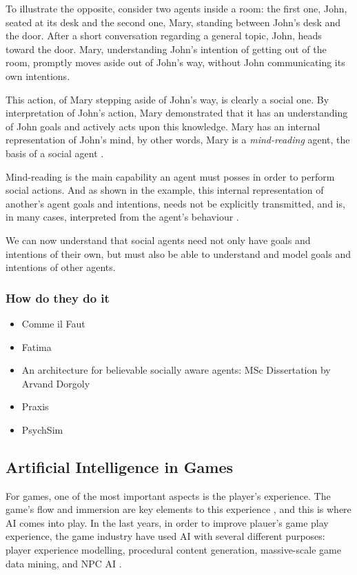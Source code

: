 To illustrate the opposite, consider two agents inside a room: the first one, John, seated at its desk and the second one, Mary, standing between John's desk and the door.
After a short conversation regarding a general topic, John, heads toward the door.
Mary, understanding John's intention of getting out of the room, promptly moves aside out of John's way, without John communicating its own intentions.

This action, of Mary stepping aside of John's way, is clearly a social one.
By interpretation of John's action, Mary demonstrated that it has an understanding of John goals and actively acts upon this knowledge.
Mary has an internal representation of John's mind, by other words, Mary is a \textit{mind-reading} agent, the basis of a social agent \cite{castelfranchi:socialactions}.

Mind-reading is the main capability an agent must posses in order to perform social actions.
And as shown in the example, this internal representation of another's agent goals and intentions, needs not be explicitly transmitted, and is, in many cases, interpreted from the agent's behaviour \cite{castelfranchi:socialactions}.

We can now understand that social agents need not only have goals and intentions of their own, but must also be able to understand and model goals and intentions of other agents.

\subsubsection{How do they do it}
\begin{itemize}
\item Comme il Faut
\item Fatima
\item An architecture for believable socially aware agents: MSc Dissertation by Arvand Dorgoly
\item Praxis
\item PsychSim
\end{itemize}
\subsection{Artificial Intelligence in Games}

For games, one of the most important aspects is the player's experience.
The game's flow and immersion are key elements to this experience \cite{ijsselsteijn:userexperience}, and this is where \ac{AI} comes into play.
In the last years, in order to improve plauer's game play experience, the game industry have used \ac{AI} with several different purposes: player experience modelling, procedural content generation, massive-scale game data mining, and \ac{NPC} \ac{AI} \cite{yannakakis:gameairevisited}.

